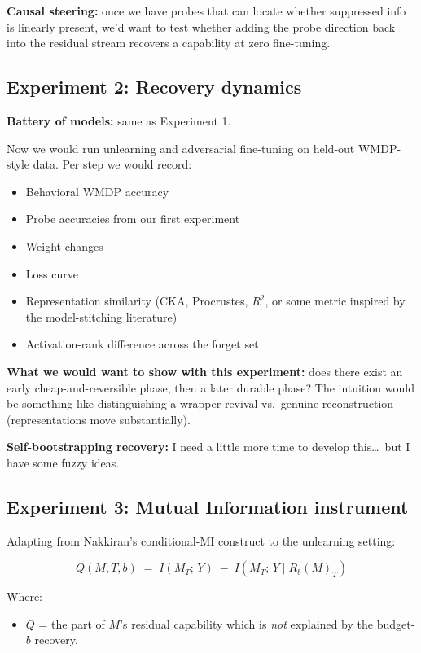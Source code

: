 \documentclass[11pt]{article}
\begin{document}
\textbf{Causal steering:} once we have probes that can locate whether suppressed
info is linearly present, we'd want to test whether adding the probe direction
back into the residual stream recovers a capability at zero fine-tuning.

\subsection*{Experiment 2: Recovery dynamics}

\textbf{Battery of models:} same as Experiment 1.

Now we would run unlearning and adversarial fine-tuning on held-out WMDP-style
data. Per step we would record:
\begin{itemize}
  \item Behavioral WMDP accuracy
  \item Probe accuracies from our first experiment
  \item Weight changes
  \item Loss curve
  \item Representation similarity (CKA, Procrustes, $R^2$, or some metric
  inspired by the model-stitching literature)
  \item Activation-rank difference across the forget set
\end{itemize}

\textbf{What we would want to show with this experiment:} does there exist an
early cheap-and-reversible phase, then a later durable phase? The intuition would
be something like distinguishing a wrapper-revival vs.\ genuine reconstruction
(representations move substantially).

\textbf{Self-bootstrapping recovery:} I need a little more time to develop
this\ldots\ but I have some fuzzy ideas.

\subsection*{Experiment 3: Mutual Information instrument}

Adapting from Nakkiran's conditional-MI construct to the unlearning setting:

\[
  Q(M, T, b) \;=\; I(M_T;\, Y) \;-\; I\!\left(M_T;\, Y \mid R_b(M)_T\right)
\]

Where:
\begin{itemize}
  \item $Q$ = the part of $M$'s residual capability which is \emph{not}
  explained by the budget-$b$ recovery.
\end{itemize}
\end{document}

